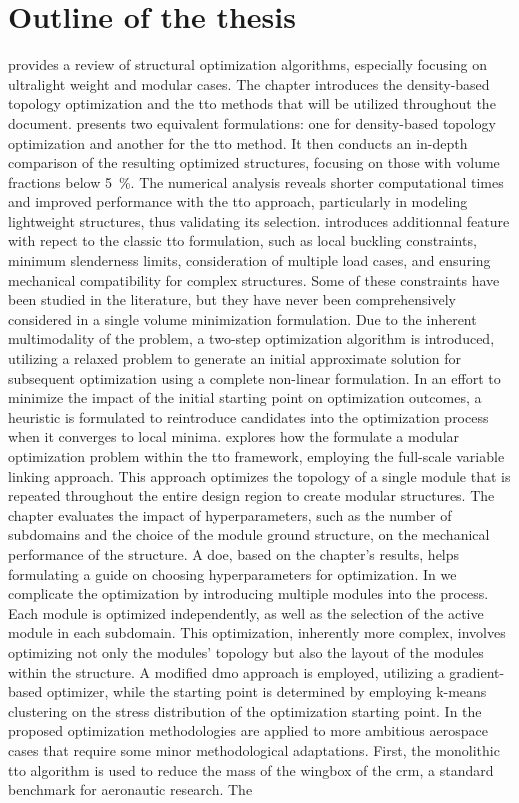 \section*{Outline of the thesis}
 provides a review of structural optimization algorithms, especially focusing on ultralight weight and modular cases. The chapter introduces the density-based topology optimization and the \gls{tto} methods that will be utilized throughout the document.  presents two equivalent formulations: one for density-based topology optimization and another for the \gls{tto} method. It then conducts an in-depth comparison of the resulting optimized structures, focusing on those with volume fractions below \qty{5}{\percent}. The numerical analysis reveals shorter computational times and improved performance with the \gls{tto} approach, particularly in modeling lightweight structures, thus validating its selection.  introduces additionnal feature with repect to the classic \gls{tto} formulation, such as local buckling constraints, minimum slenderness limits, consideration of multiple load cases, and ensuring mechanical compatibility for complex structures. Some of these constraints have been studied in the literature, but they have never been comprehensively considered in a single volume minimization formulation. Due to the inherent multimodality of the problem, a two-step optimization algorithm is introduced, utilizing a relaxed problem to generate an initial approximate solution for subsequent optimization using a complete non-linear formulation. In an effort to minimize the impact of the initial starting point on optimization outcomes, a heuristic is formulated to reintroduce candidates into the optimization process when it converges to local minima.  explores how the formulate a modular optimization problem within the \gls{tto} framework, employing the full-scale variable linking approach. This approach optimizes the topology of a single module that is repeated throughout the entire design region to create modular structures. The chapter evaluates the impact of hyperparameters, such as the number of subdomains and the choice of the module ground structure, on the mechanical performance of the structure. A \gls{doe}, based on the chapter's results, helps formulating a guide on choosing hyperparameters for optimization. In  we complicate the optimization by introducing multiple modules into the process. Each module is optimized independently, as well as the selection of the active module in each subdomain. This optimization, inherently more complex, involves optimizing not only the modules' topology but also the layout of the modules within the structure. A modified \gls{dmo} approach is employed, utilizing a gradient-based optimizer, while the starting point is determined by employing k-means clustering on the stress distribution of the optimization starting point. In  the proposed optimization methodologies are applied to more ambitious aerospace cases that require some minor methodological adaptations. First, the monolithic \gls{tto} algorithm is used to reduce the mass of the wingbox of the \gls{crm}, a standard benchmark for aeronautic research. The 